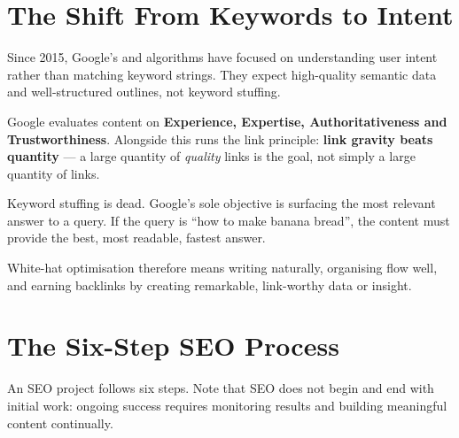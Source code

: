 \section{The Shift From Keywords to Intent}

Since 2015, Google's  and
 algorithms have focused on understanding
user intent rather than matching keyword strings. They expect high-quality
semantic data and well-structured outlines, not keyword stuffing.

\begin{keybox}[E-E-A-T]
Google evaluates content on \textbf{Experience, Expertise, Authoritativeness and
Trustworthiness}. Alongside this runs the link principle: \textbf{link gravity
beats quantity} --- a large quantity of \emph{quality} links is the goal, not
simply a large quantity of links.
\end{keybox}

\begin{warnbox}
Keyword stuffing is dead. Google's sole objective is surfacing the most relevant
answer to a query. If the query is ``how to make banana bread'', the content must
provide the best, most readable, fastest answer.

\smallskip
White-hat optimisation therefore means writing naturally, organising flow well,
and earning backlinks by creating remarkable, link-worthy data or insight.
\end{warnbox}

\section{The Six-Step SEO Process}

An SEO project follows six steps. Note that SEO does not begin and end with
initial work: ongoing success requires monitoring results and building meaningful
content continually.

